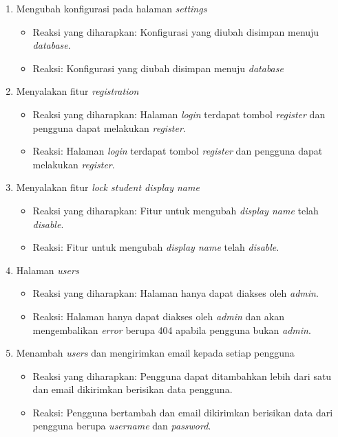 \begin{enumerate}
\begin{itemize}
	 \end{itemize}
	 \item Mengubah konfigurasi pada halaman \textit{settings}
	 \begin{itemize}
	 	\item Reaksi yang diharapkan: Konfigurasi yang diubah disimpan menuju \textit{database}.
	 	\item Reaksi: Konfigurasi yang diubah disimpan menuju \textit{database}
	 \end{itemize}
	 \item Menyalakan fitur \textit{registration}
	 \begin{itemize}
	 	\item Reaksi yang diharapkan: Halaman \textit{login} terdapat tombol \textit{register} dan pengguna dapat melakukan \textit{register}.
	 	\item Reaksi: Halaman \textit{login} terdapat tombol \textit{register} dan pengguna dapat melakukan \textit{register}.
	 \end{itemize}
	 \item Menyalakan fitur \textit{lock student display name}
	 \begin{itemize}
	 	\item Reaksi yang diharapkan: Fitur untuk mengubah \textit{display name} telah \textit{disable}.
	 	\item Reaksi: Fitur untuk mengubah \textit{display name} telah \textit{disable}.
	 \end{itemize}
	 \item Halaman \textit{users}
	 \begin{itemize}
	 	\item Reaksi yang diharapkan: Halaman hanya dapat diakses oleh \textit{admin}.
	 	\item Reaksi: Halaman hanya dapat diakses oleh \textit{admin} dan akan mengembalikan \textit{error} berupa 404 apabila pengguna bukan \textit{admin}.
	 \end{itemize}
	 \item Menambah \textit{users} dan mengirimkan email kepada setiap pengguna
	 \begin{itemize}
	 	\item Reaksi yang diharapkan: Pengguna dapat ditambahkan lebih dari satu dan email dikirimkan berisikan data pengguna.
	 	\item Reaksi: Pengguna bertambah dan email dikirimkan berisikan data dari pengguna berupa \textit{username} dan \textit{password}.
	 \end{itemize}

\end{enumerate}
